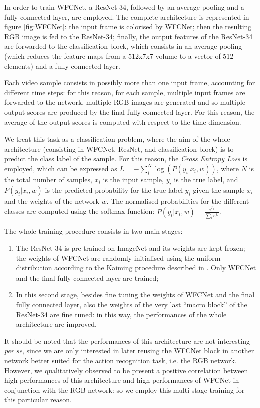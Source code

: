 \documentclass[10pt,twocolumn,letterpaper]{article}
\begin{document}
In order to train WFCNet, a ResNet-34, followed by an average pooling and a fully connected layer, are employed. The complete architecture is represented in figure \ref{fig:WFCNet}: the input frame is colorised by WFCNet; then the resulting RGB image is fed to the ResNet-34; finally, the output features of the ResNet-34 are forwarded to the classification block, which consists in an average pooling (which reduces the feature maps from a 512x7x7 volume to a vector of 512 elements) and a fully connected layer.

Each video sample consists in possibly more than one input frame, accounting for different time steps: for this reason, for each sample, multiple input frames are forwarded to the network, multiple RGB images are generated and so multiple output scores are produced by the final fully connected layer. For this reason, the average of the output scores is computed with respect to the time dimension.

We treat this task as a classification problem, where the aim of the whole architecture (consisting in WFCNet, ResNet, and classification block) is to predict the class label of the sample. For this reason, the \textit{Cross Entropy Loss} is employed, which can be expressed as ${L = -\sum_i^N{\log(P(y_i | x_i, w))}}$, where $N$ is the total number of samples, $x_i$ is the input sample, $y_i$ is the true label, and ${P(y_i | x_i, w)}$ is the predicted probability for the true label $y_i$ given the sample $x_i$ and the weights of the network $w$. The normalised probabilities for the different classes are computed using the softmax function: ${P(y_i | x_i, w) = \frac{e^{f_{y_i}}}{\sum_i e^{f_i}}}$.

The whole training procedure consists in two main stages:
\begin{enumerate}
	\item The ResNet-34 is pre-trained on ImageNet and its weights are kept frozen; the weights of WFCNet are randomly initialised using the uniform distribution according to the Kaiming procedure described in \cite{he2015delving}. Only WFCNet and the final fully connected layer are trained;
	\item In this second stage, besides fine tuning the weights of WFCNet and the final fully connected layer, also the weights of the very last ``macro block'' of the ResNet-34 are fine tuned: in this way, the performances of the whole architecture are improved.
\end{enumerate}
It should be noted that the performances of this architecture are not interesting \textit{per se}, since we are only interested in later reusing the WFCNet block in another network better suited for the action recognition task, i.e. the RGB network. However, we qualitatively observed to be present a positive correlation between high performances of this architecture and high performances of WFCNet in conjunction with the RGB network: so we employ this multi stage training for this particular reason.
\end{document}
